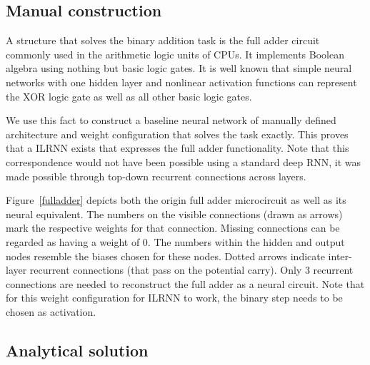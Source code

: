 \documentclass{article}
\begin{document}
\subsection{Manual construction}

A structure that solves the binary addition task is the full adder circuit commonly used in the arithmetic logic units of CPUs. It implements Boolean algebra using nothing but basic logic gates. It is well known that simple neural networks with one hidden layer and nonlinear activation functions can represent the XOR logic gate as well as all other basic logic gates. %

We use this fact to construct a baseline neural network of manually defined architecture and weight configuration that solves the task exactly. This proves that a ILRNN exists that expresses the full adder functionality. Note that this correspondence would not have been possible using a standard deep RNN, it was made possible through top-down recurrent connections across layers.

Figure~\ref{fulladder} depicts both the origin full adder microcircuit as well as its neural equivalent. The numbers on the visible connections (drawn as arrows) mark the respective weights for that connection. Missing connections can be regarded as having a weight of 0. The numbers within the hidden and output nodes resemble the biases chosen for these nodes. Dotted arrows indicate inter-layer recurrent connections (that pass on the potential carry). Only 3 recurrent connections are needed to reconstruct the full adder as a neural circuit. Note that for this weight configuration for ILRNN to work, the binary step needs to be chosen as activation. 


\subsection{Analytical solution}
\end{document}
